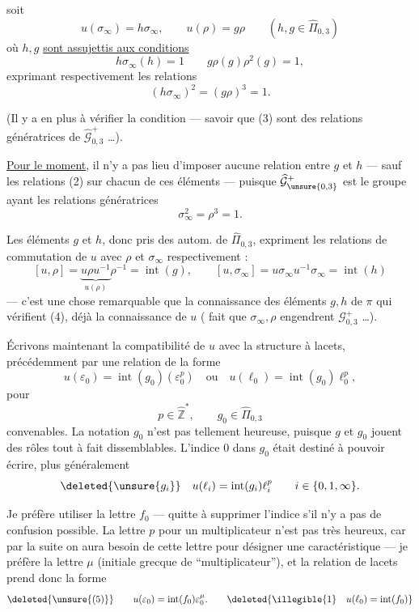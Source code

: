 soit
\[
\tag{1}
\boxed{u(\sigma_\infty)=h\sigma_\infty,\qquad u(\rho)=g\rho}
\qquad (h,g\in\widehat{\Pi}_{0,3})
\]
où $h,g$ \uline{sont assujettis aux conditions}
\[
\tag{2}
\boxed{h\sigma_\infty(h)=1\qquad g\rho(g)\rho^2(g)=1},
\]
exprimant respectivement les relations
\[
\tag{3}
\boxed{(h\sigma_\infty)^2=(g\rho)^3=1}.
\]

(Il y a en plus à vérifier la condition  --- savoir que (3) sont des relations génératrices de $\widehat{\mathcal G}_{0,3}^{+}$ \dots).

\uline{Pour le moment}, il n'y a pas lieu d'imposer aucune relation entre $g$ et $h$ --- sauf les relations (2) sur chacun de ces éléments --- puisque $\widehat{\mathcal G}_{\unsure{0,3}}^{+}$ est le groupe ayant les relations génératrices
\[
\sigma_\infty^2=\rho^3=1.
\]



Les éléments $g$ et $h$, donc pris  des autom. de $\widehat{\Pi}_{0,3}$, expriment les relations de commutation de $u$ avec \deleted{$\sigma_\infty$} $\rho$ et $\sigma_\infty$ respectivement :
\[
\tag{4}
[u,\rho]=\underbrace{u\rho u^{-1}}_{u(\rho)}\rho^{-1}=\operatorname{int}(g),
\qquad
[u,\sigma_\infty]=u\sigma_\infty u^{-1}\sigma_\infty=\operatorname{int}(h)
\]
--- c'est une chose remarquable que la connaissance des éléments $g,h$ de $\pi$ qui vérifient (4), \uline{} déjà la connaissance de $u$ (  fait que $\sigma_\infty,\rho$ engendrent $\mathcal G_{0,3}^{+}$ \dots).

Écrivons maintenant la compatibilité de $u$ avec la structure à lacets,   précédemment par une relation de la forme
\[
u(\varepsilon_0)=\operatorname{int}(g_0)(\varepsilon_0^p)
\quad\text{ou}\quad
u(\ell_0)=\operatorname{int}(g_0)\ell_0^p,
\]
pour
\[
p\in\widehat{\mathbb Z}^{*},\qquad g_0\in\widehat{\Pi}_{0,3}
\]
convenables. La notation $g_0$ n'est pas tellement heureuse, puisque $g$ et $g_0$ jouent des rôles tout à fait dissemblables. L'indice $0$ dans $g_0$ était destiné à pouvoir écrire, plus généralement
\[
\deleted{\unsure{g_i}}\quad
u(\ell_i)=\operatorname{int}(g_i)\ell_i^p
\qquad i\in\{0,1,\infty\}.
\]



Je préfère utiliser la lettre $f_0$ --- quitte à supprimer l'indice s'il n'y a pas de confusion possible. La lettre $p$ pour un multiplicateur n'est pas  très heureux, car par la suite  on aura  besoin de cette lettre pour désigner une caractéristique --- je préfère la lettre $\mu$ (initiale grecque de ``multiplicateur''), et la relation de lacets prend donc la forme
\[
\deleted{\unsure{(5)}}\qquad
u(\varepsilon_0)=\operatorname{int}(f_0)\varepsilon_0^\mu.
\qquad
\deleted{\illegible{1}\quad u(\ell_0)=\operatorname{int}(f_0)}
\]

